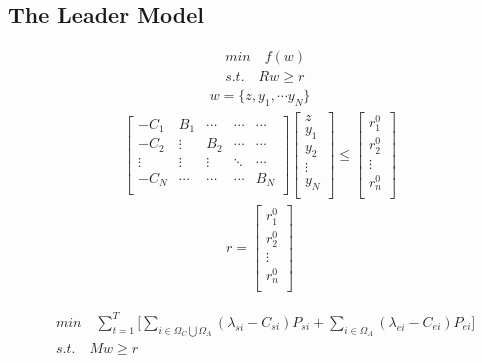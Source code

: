 \documentclass[11pt]{article} %
\begin{document}
\subsection{The Leader Model}
\begin{align}  
    &min \quad f(w)\nonumber\\
    &s.t. \quad Rw \geq r
\end{align}
\begin{align}  
    w = \{z, y_{1}, \cdots y_{N}\}
\end{align}
\begin{align}  
    \begin{bmatrix}
        -C_{1} & B_{1} & \cdots & \cdots & \cdots\\
        -C_{2} &\vdots  & B_{2} & \cdots & \cdots\\
         \vdots  & \vdots  & \vdots & \ddots  & \cdots\\
        -C_{N} & \cdots  & \cdots & \cdots & B_{N}\\
    \end{bmatrix}
    \begin{bmatrix}
        z\\
        y_1\\
        y_2\\
        \vdots \\
        y_N\\
    \end{bmatrix} \leq
    \begin{bmatrix}
        r_{1}^0\\
        r_{2}^0\\
        \vdots \\
        r_{n}^0\\
    \end{bmatrix}
\end{align}
\begin{align}  
    r = \begin{bmatrix}
        r_{1}^0\\
        r_{2}^0\\
        \vdots \\
        r_{n}^0\\
    \end{bmatrix}
\end{align}




\begin{align}  
    &min \quad \sum_{t = 1}^{T} \Bigg[ \sum_{i \in \Omega_C\bigcup \Omega_A } (\lambda _{si} - C_{si}) P_{si} + 
    \sum_{i \in \Omega_A } (\lambda _{ei} - C_{ei}) P_{ei} \Bigg] \nonumber\\
    &s.t. \quad Mw \geq r
\end{align}
\end{document}
